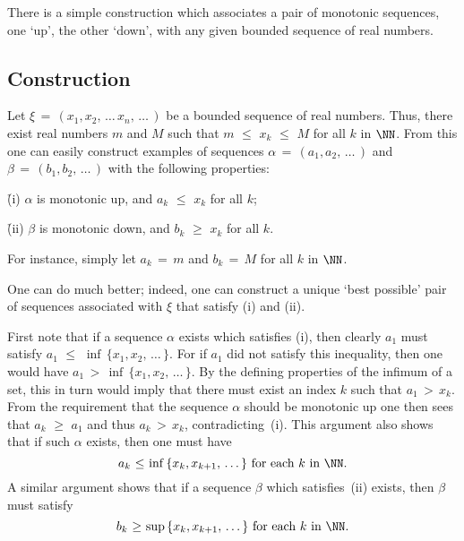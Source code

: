 \V
\V

        There is a simple construction which associates a pair of monotonic sequences, one `up', the other `down', with any given bounded sequence of real numbers.

\V

            \subsection{\small{\bf Construction}}
            \label{ConstC50.30}

        Let ${\xi} \,=\, (x_{1},x_{2},\,{\ldots}\,x_{n},\,{\ldots}\,)$ be a bounded sequence of real numbers.
    Thus, there exist real numbers $m$ and $M$ such that $m\,\,{\leq}\,\,x_{k}\,\,{\leq}\,\,M$ for all $k$ in ${\NN}$.
    From this one can easily construct examples of sequences ${\alpha} \,=\, (a_{1},a_{2},\,{\ldots}\,)$ and ${\beta} \,=\, (b_{1},b_{2},\,{\ldots}\,)$ with the following properties:

        \h (i) ${\alpha}$ is monotonic up, and $a_{k}\,\,{\leq}\,\,x_{k}$ for all $k$;

        \h (ii) ${\beta}$ is monotonic down, and $b_{k}\,\,{\geq}\,\,x_{k}$ for all $k$.

\noindent For instance, simply let $a_{k} \,=\, m$ and $b_{k} \,=\, M$ for all $k$ in ${\NN}$.

        One can do much better; indeed, one can construct a unique `best possible' pair of sequences associated with ${\xi}$ that satisfy (i) and (ii).

        First note that if a sequence ${\alpha}$ exists which satisfies (i), then clearly $a_{1}$ must satisfy $a_{1}\,\,{\leq}\,\,{\inf}\,\{x_{1},x_{2},\,{\ldots}\,\}$.
    For if $a_{1}$ did not satisfy this inequality, then one would have $a_{1}\,>\,{\inf}\,\{x_{1},x_{2},\,{\ldots}\,\}$.
    By the defining properties of the infimum of a set, this in turn would imply that there must exist an index $k$ such that $a_{1}\,>\,x_{k}$.
    From the requirement that the sequence ${\alpha}$ should be monotonic up one then sees that $a_{k}\,\,{\geq}\,\,a_{1}$ and thus $a_{k}\,>\,x_{k}$, contradicting~(i).
    This argument also shows that if such ${\alpha}$ exists, then one must have
        \begin{displaymath}
        a_{k}\,\,{\leq}\,\,{\inf}\,\{x_{k},x_{k+1},\,{\ldots}\,\} \mbox{ for each $k$ in ${\NN}$}.
        \end{displaymath}
   A similar argument shows that if a sequence ${\beta}$ which satisfies~(ii) exists, then ${\beta}$ must satisfy
        \begin{displaymath}
        b_{k}\,\,{\geq}\,\,{\sup}\,\{x_{k},x_{k+1},\,{\ldots}\,\} \mbox{ for each $k$ in ${\NN}$}.
        \end{displaymath}


